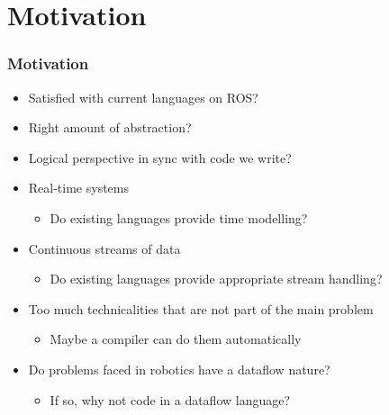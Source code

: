 \documentclass[hyperref={pdfpagelayout=SinglePage}]{beamer}
\begin{document}
\section{Motivation}
	\begin{frame} \frametitle{Motivation}
		\begin{itemize}
		\item Satisfied with current languages on ROS?
		\item Right amount of abstraction?
		\item Logical perspective in sync with code we write?
		\item Real-time systems
			\begin{itemize} \item Do existing languages provide time modelling? \end{itemize}
		\item Continuous streams of data
			\begin{itemize} \item Do existing languages provide appropriate stream handling? \end{itemize}
		\item Too much technicalities that are not part of the main problem
			\begin{itemize} \item Maybe a compiler can do them automatically \end{itemize}			
		\item Do problems faced in robotics have a dataflow nature?
			\begin{itemize} \item If so, why not code in a dataflow language? \end{itemize}			
		\end{itemize}
	\end{frame}
\end{document}
